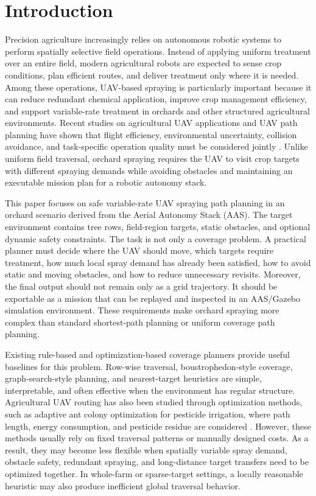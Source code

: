 \documentclass[conference,10pt]{IEEEtran}
\begin{document}
\section{Introduction}

Precision agriculture increasingly relies on autonomous robotic systems to perform spatially selective field operations. Instead of applying uniform treatment over an entire field, modern agricultural robots are expected to sense crop conditions, plan efficient routes, and deliver treatment only where it is needed. Among these operations, UAV-based spraying is particularly important because it can reduce redundant chemical application, improve crop management efficiency, and support variable-rate treatment in orchards and other structured agricultural environments. Recent studies on agricultural UAV applications and UAV path planning have shown that flight efficiency, environmental uncertainty, collision avoidance, and task-specific operation quality must be considered jointly \cite{kumar2026uavSurvey,ronchetti2020crop,gao2021aco}. Unlike uniform field traversal, orchard spraying requires the UAV to visit crop targets with different spraying demands while avoiding obstacles and maintaining an executable mission plan for a robotic autonomy stack.

This paper focuses on safe variable-rate UAV spraying path planning in an orchard scenario derived from the Aerial Autonomy Stack (AAS). The target environment contains tree rows, field-region targets, static obstacles, and optional dynamic safety constraints. The task is not only a coverage problem. A practical planner must decide where the UAV should move, which targets require treatment, how much local spray demand has already been satisfied, how to avoid static and moving obstacles, and how to reduce unnecessary revisits. Moreover, the final output should not remain only as a grid trajectory. It should be exportable as a mission that can be replayed and inspected in an AAS/Gazebo simulation environment. These requirements make orchard spraying more complex than standard shortest-path planning or uniform coverage path planning.

Existing rule-based and optimization-based coverage planners provide useful baselines for this problem. Row-wise traversal, boustrophedon-style coverage, graph-search-style planning, and nearest-target heuristics are simple, interpretable, and often effective when the environment has regular structure. Agricultural UAV routing has also been studied through optimization methods, such as adaptive ant colony optimization for pesticide irrigation, where path length, energy consumption, and pesticide residue are considered \cite{gao2021aco}. However, these methods usually rely on fixed traversal patterns or manually designed costs. As a result, they may become less flexible when spatially variable spray demand, obstacle safety, redundant spraying, and long-distance target transfers need to be optimized together. In whole-farm or sparse-target settings, a locally reasonable heuristic may also produce inefficient global traversal behavior.
\end{document}
